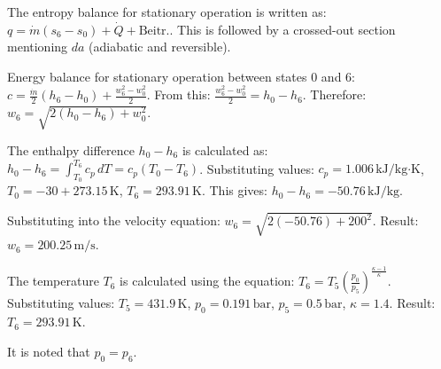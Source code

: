 The entropy balance for stationary operation is written as:  
\( q = \dot{m} (s_6 - s_0) + \dot{Q} + \text{Beitr.} \).  
This is followed by a crossed-out section mentioning \( da \) (adiabatic and reversible).  

Energy balance for stationary operation between states 0 and 6:  
\( c = \frac{\dot{m}}{2} (h_6 - h_0) + \frac{w_6^2 - w_0^2}{2} \).  
From this:  
\( \frac{w_6^2 - w_0^2}{2} = h_0 - h_6 \).  
Therefore:  
\( w_6 = \sqrt{2(h_0 - h_6) + w_0^2} \).  

The enthalpy difference \( h_0 - h_6 \) is calculated as:  
\( h_0 - h_6 = \int_{T_0}^{T_6} c_p \, dT = c_p (T_0 - T_6) \).  
Substituting values:  
\( c_p = 1.006 \, \text{kJ/kg·K} \), \( T_0 = -30 + 273.15 \, \text{K} \), \( T_6 = 293.91 \, \text{K} \).  
This gives:  
\( h_0 - h_6 = -50.76 \, \text{kJ/kg} \).  

Substituting into the velocity equation:  
\( w_6 = \sqrt{2(-50.76) + 200^2} \).  
Result:  
\( w_6 = 200.25 \, \text{m/s} \).  

The temperature \( T_6 \) is calculated using the equation:  
\( T_6 = T_5 \left( \frac{p_0}{p_5} \right)^{\frac{\kappa - 1}{\kappa}} \).  
Substituting values:  
\( T_5 = 431.9 \, \text{K} \), \( p_0 = 0.191 \, \text{bar} \), \( p_5 = 0.5 \, \text{bar} \), \( \kappa = 1.4 \).  
Result:  
\( T_6 = 293.91 \, \text{K} \).  

It is noted that \( p_0 = p_6 \).